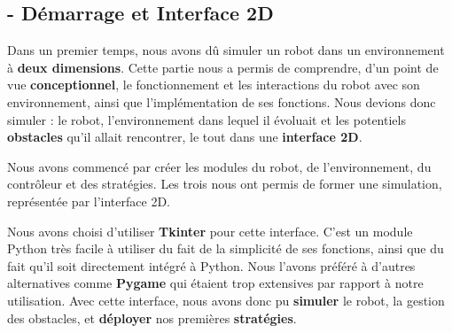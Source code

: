 \documentclass[12pt]{article}
\begin{document}

\subsection*{- Démarrage et Interface 2D}

\hspace{\parindent}Dans un premier temps, nous avons dû simuler un robot dans un environnement à \textbf{deux dimensions}. Cette partie nous a permis de comprendre, d'un point de vue \textbf{conceptionnel}, le fonctionnement et les interactions du robot avec son environnement, ainsi que l'implémentation de ses fonctions. Nous devions donc simuler : le robot, l’environnement dans lequel il évoluait et les potentiels \textbf{obstacles} qu’il allait rencontrer, le tout dans une \textbf{interface 2D}.

\hspace{\parindent}Nous avons commencé par créer les modules du robot, de l'environnement, du contrôleur et des stratégies. Les trois nous ont permis de former une simulation, représentée par l'interface 2D.

\hspace{\parindent}Nous avons choisi d'utiliser \textbf{Tkinter} pour cette interface. C’est un module Python très facile à utiliser du fait de la simplicité de ses fonctions, ainsi que du fait qu’il soit directement intégré à Python. Nous l'avons préféré à d'autres alternatives comme \textbf{Pygame} qui étaient trop extensives par rapport à notre utilisation. Avec cette interface, nous avons donc pu \textbf{simuler} le robot, la gestion des obstacles, et \textbf{déployer} nos premières \textbf{stratégies}.

\FloatBarrier
\end{document}

